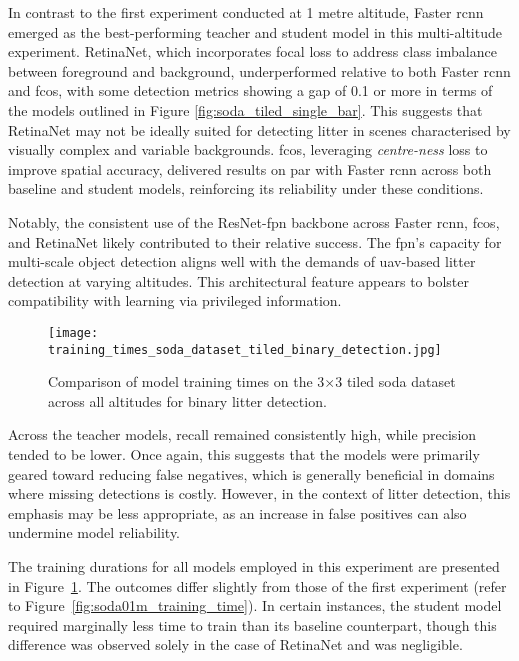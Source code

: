 In contrast to the first experiment conducted at 1 metre altitude, Faster \gls{rcnn} emerged as the best-performing teacher and student model in this multi-altitude experiment. RetinaNet, which incorporates focal loss to address class imbalance between foreground and background, underperformed relative to both Faster \gls{rcnn} and \gls{fcos}, with some detection metrics showing a gap of 0.1 or more in terms of the models outlined in Figure \ref{fig:soda_tiled_single_bar}. This suggests that RetinaNet may not be ideally suited for detecting litter in scenes characterised by visually complex and variable backgrounds. \gls{fcos}, leveraging \textit{centre-ness} loss to improve spatial accuracy, delivered results on par with Faster \gls{rcnn} across both baseline and student models, reinforcing its reliability under these conditions.

Notably, the consistent use of the ResNet-\gls{fpn} backbone across Faster \gls{rcnn}, \gls{fcos}, and RetinaNet likely contributed to their relative success. The \gls{fpn}’s capacity for multi-scale object detection aligns well with the demands of \gls{uav}-based litter detection at varying altitudes. This architectural feature appears to bolster compatibility with learning via privileged information.

\begin{figure}[!t]
    \centering
    \texttt{[image: training\_times\_soda\_dataset\_tiled\_binary\_detection.jpg]}
    \caption{Comparison of model training times on the 3$\times$3 tiled \gls{soda} dataset across all altitudes for binary litter detection.}
    \label{fig:soda_tiled_single_training_time}
\end{figure}

Across the teacher models, recall remained consistently high, while precision tended to be lower. Once again, this suggests that the models were primarily geared toward reducing false negatives, which is generally beneficial in domains where missing detections is costly. However, in the context of litter detection, this emphasis may be less appropriate, as an increase in false positives can also undermine model reliability.

The training durations for all models employed in this experiment are presented in Figure~\ref{fig:soda_tiled_single_training_time}. The outcomes differ slightly from those of the first experiment (refer to Figure~\ref{fig:soda01m_training_time}). In certain instances, the student model required marginally less time to train than its baseline counterpart, though this difference was observed solely in the case of RetinaNet and was negligible.

